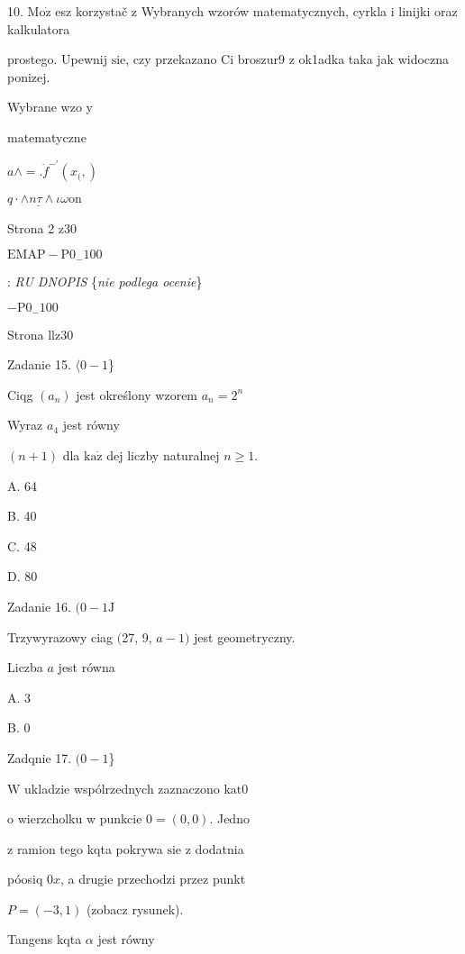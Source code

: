 \documentclass[a4paper,12pt]{article}
\begin{document}
10. $\mathrm{M}\mathrm{o}\dot{\mathrm{z}}$ esz korzystač z Wybranych wzorów matematycznych, cyrkla i linijki oraz kalkulatora

prostego. Upewnij $\mathrm{s}\mathrm{i}\mathrm{e}$, czy przekazano Ci broszur9 z ok1adka taka jak widoczna ponizej.

Wybrane wzo y

matematyczne

$a\wedge=.\dot{f}^{-\prime}(x_{(},)$

$q\cdot\underline{\wedge n\tau\wedge}\iota\omega \mathrm{o}\mathrm{n}$

Strona 2 z30

$\mathrm{E}\mathrm{M}\mathrm{A}\mathrm{P}-\mathrm{P}0_{-}100$





: {\it RU DNOPIS} \{{\it nie podlega ocenie}\}

$-\mathrm{P}0_{-}100$

Strona llz30





Zadanie 15. $\langle 0-1$\}

Ciqg $(a_{n})$ jest określony wzorem $a_{n}=2^{n}$

Wyraz $a_{4}$ jest równy

$(n+1)$ dla $\mathrm{k}\mathrm{a}\dot{\mathrm{z}}$ dej liczby naturalnej $n\geq 1.$

A. 64

B. 40

C. 48

D. 80

Zadanie 16. $(0-1\mathrm{J}$

Trzywyrazowy ciag $($27, 9, $a-1)$ jest geometryczny.

Liczba $a$ jest równa

A. 3

B. 0

Zadqnie 17. $(0-1$\}

$\mathrm{W}$ ukladzie wspólrzednych zaznaczono $\mathrm{k}\mathrm{a}\mathrm{t} 0$

o wierzcholku w punkcie $0=(0,0)$. Jedno

z ramion tego kqta pokrywa $\mathrm{s}\mathrm{i}\mathrm{e}$ z dodatnia

póosiq $0x$, a drugie przechodzi przez punkt

$P=(-3,1)$ (zobacz rysunek).

Tangens kqta $\alpha$ jest równy
\end{document}
